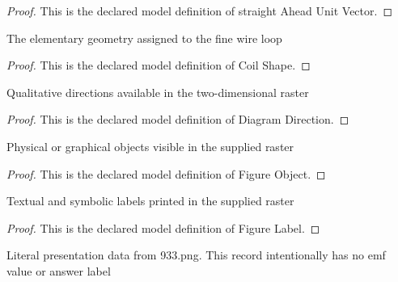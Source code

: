 \begin{proof}
  This is the declared model definition of straight Ahead Unit Vector.
\end{proof}
\begin{definition}
  \label{def:physics:phyx-mini-0933:phyxminiproblems-problemphyxmini0933-coilshape}
  The elementary geometry assigned to the fine wire loop
\end{definition}
\begin{proof}
  This is the declared model definition of Coil Shape.
\end{proof}
\begin{definition}
  \label{def:physics:phyx-mini-0933:phyxminiproblems-problemphyxmini0933-diagramdirection}
  Qualitative directions available in the two-dimensional raster
\end{definition}
\begin{proof}
  This is the declared model definition of Diagram Direction.
\end{proof}
\begin{definition}
  \label{def:physics:phyx-mini-0933:phyxminiproblems-problemphyxmini0933-figureobject}
  Physical or graphical objects visible in the supplied raster
\end{definition}
\begin{proof}
  This is the declared model definition of Figure Object.
\end{proof}
\begin{definition}
  \label{def:physics:phyx-mini-0933:phyxminiproblems-problemphyxmini0933-figurelabel}
  Textual and symbolic labels printed in the supplied raster
\end{definition}
\begin{proof}
  This is the declared model definition of Figure Label.
\end{proof}
\begin{definition}
  \label{def:physics:phyx-mini-0933:phyxminiproblems-problemphyxmini0933-eyecoilfigure}
  Literal presentation data from 933.png. This record intentionally has no emf value or answer label
\end{definition}
